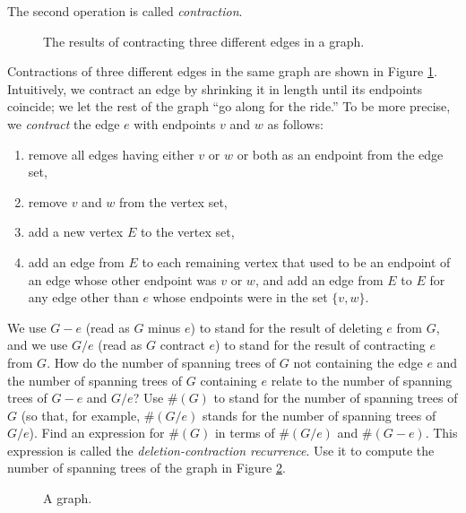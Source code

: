   The second operation is called {\em
contraction}.
\begin{figure}[hbt]\caption{The results of
contracting three different edges in a
graph.}\label{threecontractions}\vglue-1in
\begin{center}\mbox{}
\end{center}
\end{figure} 
  Contractions of three
different edges in the same graph are shown in Figure
\ref{threecontractions}. Intuitively, we contract an edge by shrinking it
in length until its endpoints coincide; we let the rest of the graph ``go
along for the ride.''  To be more precise, we
{\em contract} the edge
$e$ with endpoints
$v$ and
$w$ as follows:
\begin{enumerate}
\item remove all edges having either
$v$ or $w$ or both as an endpoint from the edge set, 
\item remove $v$ and $w$ from the vertex set,
\item add a new vertex
$E$ to the vertex set, 
\item add an edge from $E$ to each remaining
vertex that used to be an endpoint of an edge whose other endpoint was
$v$ or $w$, and add an edge from $E$ to $E$ for any edge other than
$e$ whose endpoints were in the set $\{v,w\}$.
\end{enumerate}
 We use $G-e$ (read as $G$
minus $e$) to stand for the result of deleting $e$ from $G$, and we use
$G/e$ (read as $G$ contract $e$) to stand for the result of contracting
$e$ from $G$.
\bp
\itemesi How do the number of spanning trees of $G$ not containing the edge
$e$ and the number of spanning trees of $G$ containing $e$ relate to the
number of spanning trees of $G-e$ and $G/e$?  Use $\#(G)$ to stand for
the number of spanning trees of $G$ (so that, for example, $\#(G/e)$
stands for the number of spanning trees of $G/e$).  Find an expression
for
$\#(G)$ in terms of $\#(G/e)$ and $\#(G-e)$.  This expression is called
the {\em deletion-contraction recurrence}.  Use it to compute the
number of spanning trees of the graph in Figure
\ref{spantreeexercise}.  
\begin{figure}[htb]\caption{A
graph.}\label{spantreeexercise}%
\begin{center}\mbox{}
\end{center}
\end{figure}
